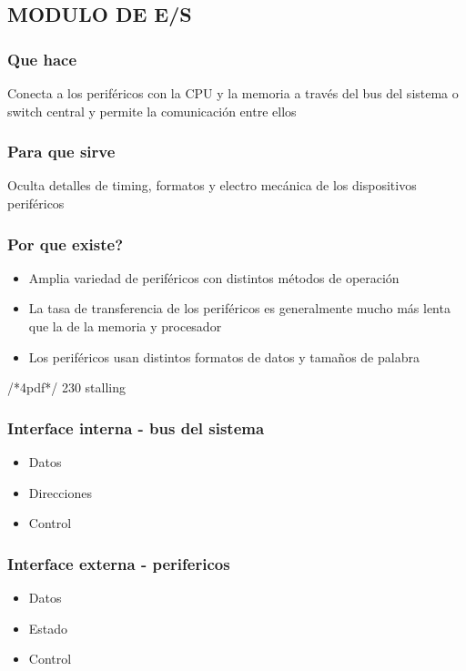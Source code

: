 \subsection{MODULO DE E/S }

\subsubsection{Que hace}
Conecta a los periféricos con la CPU y la memoria a través del bus del sistema o switch central y permite la comunicación entre ellos
\subsubsection{Para que sirve}
Oculta detalles de timing, formatos y electro mecánica de los dispositivos periféricos
\subsubsection{Por que existe?}
\begin{itemize}
\item Amplia variedad de periféricos con distintos métodos de operación
\item La tasa de transferencia de los periféricos es generalmente mucho más lenta que la de la memoria y procesador
\item Los periféricos usan distintos formatos de datos y tamaños de palabra
\end{itemize}

/*4pdf*/ 230 stalling

\subsubsection{Interface interna - bus del sistema}
\begin{itemize}
\item Datos
\item Direcciones
\item Control
\end{itemize}

\subsubsection{Interface externa - perifericos}
\begin{itemize}
\item Datos
\item Estado
\item Control
\end{itemize}


